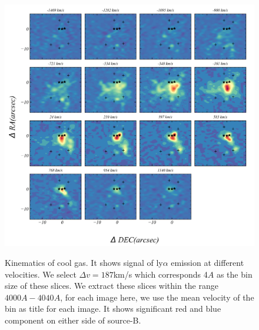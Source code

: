 	\begin{figure}[htp]
		\centering
		\includegraphics[width=\textwidth]{figs/slices}
		\label{slices}
		\caption{Kinematics of cool gas. It shows signal of ly$\alpha$ emission at different velocities. We select $\Delta v=187$km/s which corresponds 4$A$  as the bin size of these slices. We extract these slices within the range $4000A-4040A$, for each image here, we use the mean velocity of the bin as title for each image. It shows significant red and blue component on either side of source-B.}
	\end{figure}
	
